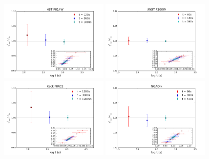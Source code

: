 \documentclass[a4paper,11pt]{article}
\begin{document}

\begin{figure}
\begin{center}
\includegraphics[width=0.48\textwidth]{figures/gamma_0330_2QSOimages_HST.png}
\includegraphics[width=0.48\textwidth]{figures/gamma_0330_2QSOimages_JWST.png} \\
\includegraphics[width=0.48\textwidth]{figures/gamma_0330_2QSOimages_Keck.png}
\includegraphics[width=0.48\textwidth]{figures/gamma_0330_2QSOimages_NGAO.png} \\

\end{center}
\end{figure}
\end{document}
